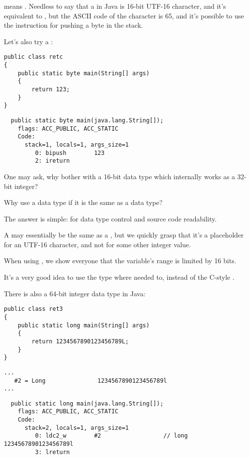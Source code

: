  means .
Needless to say that a  in Java is 16-bit UTF-16 character, 
and it's equivalent to , but the ASCII code of the  character is 65, and it's possible
to use the instruction for pushing a byte in the stack.

Let's also try a :

\begin{lstlisting}[style=customjava]
public class retc
{
	public static byte main(String[] args) 
	{
		return 123;
	}
}
\end{lstlisting}

\begin{lstlisting}
  public static byte main(java.lang.String[]);
    flags: ACC_PUBLIC, ACC_STATIC
    Code:
      stack=1, locals=1, args_size=1
         0: bipush        123
         2: ireturn       
\end{lstlisting}

One may ask, why bother with a 16-bit  data type which internally works
as a 32-bit integer?

Why use a  data type if it is the same as a  data type?

The answer is simple: for data type control and source code readability.

A  may essentially be the same as a , but we quickly grasp that it's a placeholder for
an UTF-16 character, and not for some other integer value.

When using , we show everyone that the variable's range is limited by 16 bits.

It's a very good idea to use the  type where needed to, 
instead of the C-style .

There is also a 64-bit integer data type in Java:

\begin{lstlisting}[style=customjava]
public class ret3
{
	public static long main(String[] args)
	{
		return 1234567890123456789L;
	}
}
\end{lstlisting}

\begin{lstlisting}[caption=Constant pool]
...
   #2 = Long               1234567890123456789l
...
\end{lstlisting}

\begin{lstlisting}
  public static long main(java.lang.String[]);
    flags: ACC_PUBLIC, ACC_STATIC
    Code:
      stack=2, locals=1, args_size=1
         0: ldc2_w        #2                  // long 1234567890123456789l
         3: lreturn       
\end{lstlisting}

